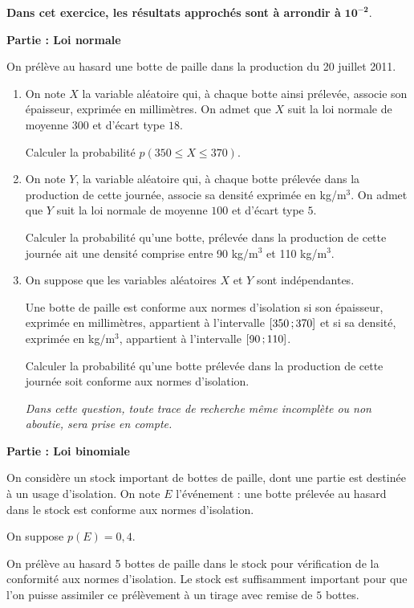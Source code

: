 \documentclass[10pt,a4paper]{article}
\newcommand{\inter}[4]
{\mathchoice
{\left#1#2\mathclose{}\mathpunct{};#3\right#4}%
{\mathopen{#1}#2\mathclose{}\mathpunct{};#3\mathclose{#4}}%
{\mathopen{#1}#2\mathclose{}\mathpunct{};#3\mathclose{#4}}%
{\mathopen{#1}#2\mathclose{}\mathpunct{};#3\mathclose{#4}}%
}
\newcommand{\interff }[2]{\ensuremath{\inter{[}{#1}{#2}{]}}} %
\renewcommand{\leq}{\leqslant}
\newcounter{num}
\newcounter{Partie}
\newcommand{\Partie}[1]%
   {%
   \goodbreak%
   \addtocounter{Partie}{1}
   \noindent\textbf{Partie \Alph{Partie} : #1}%
   \par%
   }%
\begin{document}
\begin{center}
 \textbf{Dans cet exercice, les résultats approchés sont à arrondir à
}$\mathbf{10^{-2}.}$
\end{center}

\Partie{Loi normale}

On prélève au hasard une botte de paille dans la production du 20 juillet 2011.

\begin{enumerate}
 \item On note $X$ la variable aléatoire qui, à chaque botte ainsi prélevée,
associe son épaisseur, exprimée en millimètres. On admet que $X$ suit la loi
normale de moyenne $300$ et d’écart type $18$.

Calculer la probabilité $p(350\leq X\leq 370)$.

\item On note $Y$, la variable aléatoire qui, à chaque botte prélevée dans la
production de cette journée, associe sa densité exprimée en kg/m$^3$. On admet
que $Y$ suit la loi normale de moyenne $100$ et d’écart type $5$.

Calculer la probabilité qu’une botte, prélevée dans la production de cette
journée ait une densité comprise entre 90 kg/m$^3$ et 110 kg/m$^3$.

\item On suppose que les variables aléatoires $X$ et $Y$ sont indépendantes.

Une botte de paille est conforme aux normes d'isolation si son épaisseur,
exprimée en millimètres, appartient à l'intervalle $\interff{350}{370}$ et si
sa densité, exprimée en kg/m$^3$, appartient à l'intervalle $\interff{90}{110}$.

Calculer la probabilité qu'une botte prélevée dans la production de cette
journée soit conforme aux normes d'isolation.

\emph{Dans cette question, toute trace de recherche même incomplète ou non
aboutie, sera prise en compte.}
\end{enumerate}

\Partie{Loi binomiale}

On considère un stock important de bottes de paille, dont une partie est
destinée à un usage d'isolation. On note $E$ l'événement : \og une botte
prélevée au hasard dans le stock est conforme aux normes d'isolation\fg.

On suppose $p(E)=0,4$.

On prélève au hasard 5 bottes de paille dans le stock pour vérification de la
conformité aux normes d'isolation. Le stock est suffisamment important pour que
l'on puisse assimiler ce prélèvement à un tirage avec remise de $5$ bottes.
\end{document}
